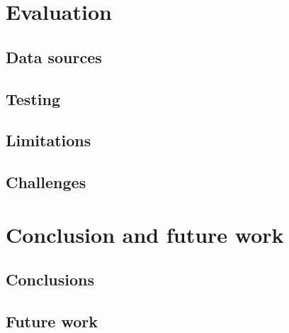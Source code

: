 \documentclass[a4paper,12pt,twoside,openright]{report}
\begin{document}
\chapter{Evaluation}
 

\section{Data sources}
\section{Testing}
\section{Limitations}
\section{Challenges} %


\chapter{Conclusion and future work} 
\section{Conclusions}
\section{Future work}





\appendix
\singlespacing

 

\end{document}

